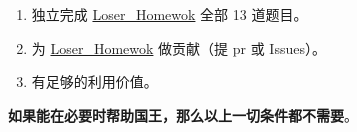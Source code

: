 \begin{enumerate}

    \item 独立完成 \href{https://github.com/Mq-b/Loser-HomeWork}{Loser\_Homewok} 全部 13 道题目。
    \item 为 \href{https://github.com/Mq-b/Loser-HomeWork}{Loser\_Homewok} 做贡献（提 pr 或 Issues）。
    \item 有足够的利用价值。
\end{enumerate}

\textbf{如果能在必要时帮助国王，那么以上一切条件都不需要}。